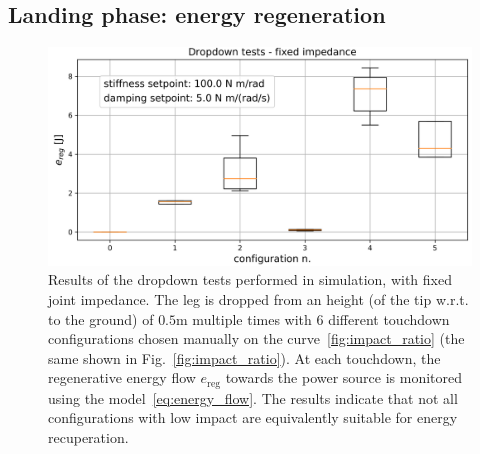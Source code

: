 \subsection{Landing phase: energy regeneration}\label{subsec:energy_reg}
\begin{figure}[t]
    \centering
    \includegraphics[width=1\columnwidth]{images/dropdown_const_imp.pdf}
    \caption{Results of the dropdown tests performed in simulation, with fixed joint impedance. The leg is dropped from an height (of the tip w.r.t. to the ground) of $0.5\mathrm{m}$ multiple times with 6 different touchdown configurations chosen manually on the curve~\ref{fig:impact_ratio} (the same shown in Fig.~\ref{fig:impact_ratio}). At each touchdown, the regenerative energy flow $e_{\mathrm{reg}}$ towards the power source is monitored using the model~\eqref{eq:energy_flow}. The results indicate that not all configurations with low impact are equivalently suitable for energy recuperation.}
    \label{fig:fixed_imp_reg_energy}
\end{figure}
